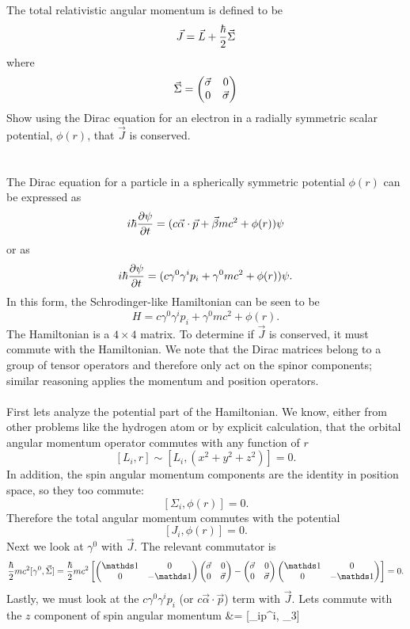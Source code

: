 \documentclass[10pt,letterpaper]{article}
\begin{document}
	
	\item
	The total 	relativistic angular momentum is defined to be
	\[
		\vec J = \vec L +\frac{\h}{2}\vec \Sigma
	\]
	where
	\[
		\vec \Sigma = \bpm \vec\sigma&0\\0&\vec\sigma \epm
	\]
	Show using the Dirac equation for an electron in a radially symmetric scalar potential, 
	$\phi(r)$, that $\vec J$ is conserved.
	\\ 
	\\
	\\
	The Dirac equation for a particle in a spherically symmetric potential $\phi(r)$ can be expressed as
	\[
		i\h \pdiff[\psi]{t} = (c\vec \alpha \cdot \vec p +\vec \beta mc^2+\phi(r))\psi
	\]
	or as
	\[
		i\h \pdiff[\psi]{t} = (c\gamma^0\gamma^i p_i +\gamma^0 mc^2+\phi(r))\psi.
	\]
	In this form, the Schrodinger-like Hamiltonian can be seen to be
	\[
		H = c\gamma^0\gamma^i p_i +\gamma^0 mc^2+\phi(r).
	\]
	The Hamiltonian is a $4\times4$ matrix. To determine if $\vec J$ is conserved, it must commute 
	with the Hamiltonian. We note that the Dirac matrices belong to a group of tensor operators and therefore
	only act on the spinor components; similar reasoning applies the momentum and position operators. 
	\\
	\\
	First lets analyze the potential part of the Hamiltonian. We know, either from other problems like the hydrogen
	atom or by explicit 
	calculation, that the orbital angular momentum operator commutes with any function of $r$
	\[
		[L_i,r] \sim [L_i, (x^2+y^2+z^2)] = 0.
	\]
	In addition, the spin angular momentum components are the identity in position space, so they too commute:
	\[
		[\Sigma_i,\phi(r)] = 0.
	\]
	Therefore the total angular momentum commutes with the potential
	\[
		[J_i,\phi(r)] = 0.
	\]
	Next we look at $\gamma^0$ with $\vec J$. The relevant commutator is
	\[
		\frac{\h}{2}mc^2[\gamma^0,\vec\Sigma] = \frac{\h}{2}mc^2
		\blr{\bpm \mathds 1 &0 \\ 0& -\mathds 1 \epm 
		\bpm \vec\sigma &0 \\ 0 &\vec\sigma \epm-\bpm \vec\sigma &0 \\ 0 &\vec\sigma \epm
		\bpm \mathds 1 &0 \\ 0& -\mathds 1 \epm  } =0  .
	\]
	Lastly, we must look at the $c\gamma^0\gamma^i p_i $ (or $c\vec \alpha \cdot \vec p$) term with $\vec J$. Lets 
	commute with the 
	$z$ component of spin angular momentum
	 &=  [\alpha_ip^i, \Sigma_3] \\
\end{document}
